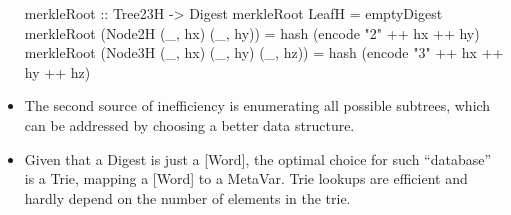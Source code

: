 \begin{itemize}
    \begin{haskell}
        merkleRoot :: Tree23H -> Digest
        merkleRoot LeafH = emptyDigest
        merkleRoot (Node2H (_, hx) (_, hy)) 
            = hash (encode "2" ++ hx ++ hy)
        merkleRoot (Node3H (_, hx) (_, hy) (_, hz))
            = hash (encode "3" ++ hx ++ hy ++ hz)
    \end{haskell}
    \item The second source of inefficiency is enumerating all possible subtrees, which can be addressed by choosing a better data structure.
    \item  Given that a Digest is just a [Word], the optimal choice for such “database” is a Trie, mapping a [Word] to a MetaVar. Trie lookups are efficient and hardly depend on the number of elements in the trie.
\end{itemize}

